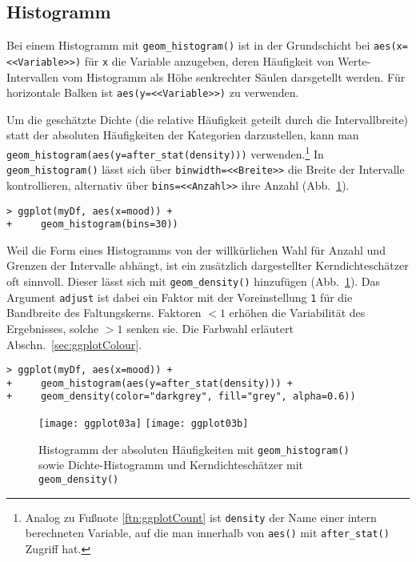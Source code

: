 \subsection{Histogramm}
\label{sec:gghist}

Bei einem Histogramm mit \lstinline!geom_histogram()! ist in der Grundschicht bei \lstinline!aes(x=<<Variable>>)! für \lstinline!x! die Variable anzugeben, deren Häufigkeit von Werte-Intervallen vom Histogramm als Höhe senkrechter Säulen darsgetellt werden. Für horizontale Balken ist \lstinline!aes(y=<<Variable>>)! zu verwenden.

Um die geschätzte Dichte (die relative Häufigkeit geteilt durch die Intervallbreite) statt der absoluten Häufigkeiten der Kategorien darzustellen, kann man \lstinline!geom_histogram(aes(y=after_stat(density)))! verwenden.\footnote{Analog zu Fußnote \ref{ftn:ggplotCount} ist \lstinline!density! der Name einer intern berechneten Variable, auf die man innerhalb von \lstinline!aes()! mit \lstinline!after_stat()! Zugriff hat.} In \lstinline!geom_histogram()! lässt sich über \lstinline!binwidth=<<Breite>>! die Breite der Intervalle kontrollieren, alternativ über \lstinline!bins=<<Anzahl>>! ihre Anzahl (Abb.\ \ref{fig:ggplot03}).
\begin{lstlisting}
> ggplot(myDf, aes(x=mood)) +
+     geom_histogram(bins=30))
\end{lstlisting}

Weil die Form eines Histogramms von der willkürlichen Wahl für Anzahl und Grenzen der Intervalle abhängt, ist ein zusätzlich dargestellter Kerndichteschätzer oft sinnvoll. Dieser lässt sich mit \lstinline!geom_density()! hinzufügen (Abb.\ \ref{fig:ggplot03}). Das Argument \lstinline!adjust! ist dabei ein Faktor mit der Voreinstellung \lstinline!1! für die Bandbreite des Faltungskerns. Faktoren $< 1$ erhöhen die Variabilität des Ergebnisses, solche $> 1$ senken sie. Die Farbwahl erläutert Abschn.\ \ref{sec:ggplotColour}.
\begin{lstlisting}
> ggplot(myDf, aes(x=mood)) +
+     geom_histogram(aes(y=after_stat(density))) +
+     geom_density(color="darkgrey", fill="grey", alpha=0.6))
\end{lstlisting}

\begin{figure}[ht]
\centering
\texttt{[image: ggplot03a]}
\texttt{[image: ggplot03b]}
\vspace*{-0.5em}
\caption{Histogramm der absoluten Häufigkeiten mit \lstinline!geom_histogram()! sowie Dichte-Histogramm und Kerndichteschätzer mit \lstinline!geom_density()!}
\label{fig:ggplot03}
\end{figure}


